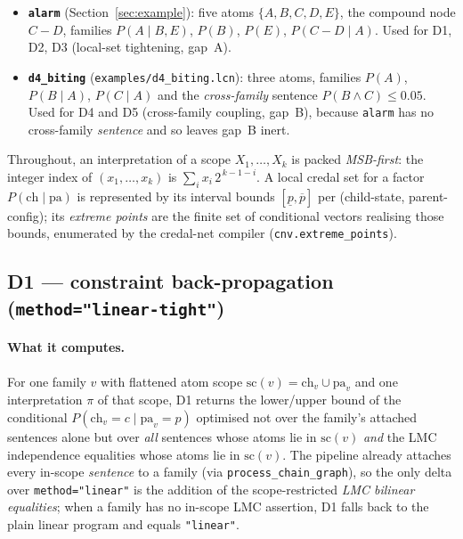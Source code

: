 \documentclass[11pt]{article}
\begin{document}
\begin{itemize}
  \item \textbf{\texttt{alarm}} (Section~\ref{sec:example}): five atoms $\{A,B,C,D,E\}$, the
    compound node $C\!-\!D$, families $P(A\mid B,E)$, $P(B)$, $P(E)$, $P(C\!-\!D\mid A)$. Used
    for D1, D2, D3 (local-set tightening, gap~A).
  \item \textbf{\texttt{d4\_biting}} (\texttt{examples/d4\_biting.lcn}): three atoms, families
    $P(A)$, $P(B\mid A)$, $P(C\mid A)$ and the \emph{cross-family} sentence
    $P(B\land C)\le 0.05$. Used for D4 and D5 (cross-family coupling, gap~B), because
    \texttt{alarm} has no cross-family \emph{sentence} and so leaves gap~B inert.
\end{itemize}

Throughout, an interpretation of a scope $X_1,\dots,X_k$ is packed \emph{MSB-first}: the
integer index of $(x_1,\dots,x_k)$ is $\sum_i x_i\,2^{\,k-1-i}$. A local credal set for a
factor $P(\mathrm{ch}\mid\mathrm{pa})$ is represented by its interval bounds
$[\underline p,\overline p]$ per (child-state, parent-config); its \emph{extreme points} are
the finite set of conditional vectors realising those bounds, enumerated by the credal-net
compiler (\texttt{cnv.extreme\_points}).

\subsection{D1 --- constraint back-propagation (\texttt{method="linear-tight"})}
\label{sec:d1-detail}

\paragraph{What it computes.} For one family $v$ with flattened atom scope
$\mathrm{sc}(v)=\mathrm{ch}_v\cup\mathrm{pa}_v$ and one interpretation $\pi$ of that scope, D1
returns the lower/upper bound of the conditional $P(\mathrm{ch}_v{=}c\mid\mathrm{pa}_v{=}p)$
optimised not over the family's attached sentences alone but over \emph{all} sentences whose
atoms lie in $\mathrm{sc}(v)$ \emph{and} the LMC independence equalities whose atoms lie in
$\mathrm{sc}(v)$. The pipeline already attaches every in-scope \emph{sentence} to a family
(via \texttt{process\_chain\_graph}), so the only delta over \texttt{method="linear"} is the
addition of the scope-restricted \emph{LMC bilinear equalities}; when a family has no in-scope
LMC assertion, D1 falls back to the plain linear program and equals \texttt{"linear"}.
\end{document}
